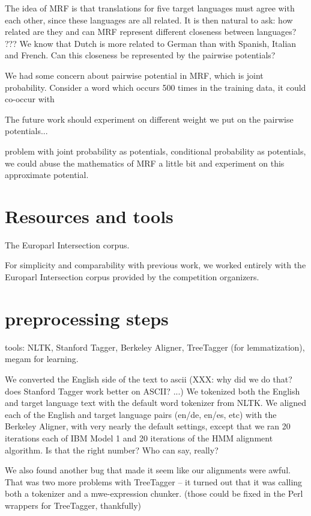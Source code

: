 \documentclass[11pt,letterpaper]{article}
\begin{document}
The idea of MRF is that translations for five target languages must agree with
each other, since these languages are all related.  It is then natural to ask:
how related are they and can MRF represent different closeness between
languages?  ???  We know that Dutch is more related to German than with
Spanish, Italian and French. Can this closeness be represented by the pairwise
potentials?

We had some concern about pairwise potential in MRF, which is joint
probability. Consider a word which occurs 500 times in the training data, it
could co-occur with

The future work should experiment on different weight we put on the pairwise
potentials...

problem with joint probability as potentials, conditional probability as
potentials, we could abuse the mathematics of MRF a little bit and experiment
on this approximate potential.

\section{Resources and tools}
The Europarl Intersection corpus.

For simplicity and comparability with previous work, we worked entirely with
the Europarl Intersection corpus provided by the competition organizers.
	

\section{preprocessing steps}
tools: NLTK, Stanford Tagger, Berkeley Aligner, TreeTagger (for lemmatization),
megam for learning.

We converted the English side of the text to ascii (XXX: why did we do that?
does Stanford Tagger work better on ASCII? ...) We tokenized both the English
and target language text with the default word tokenizer from NLTK.  We aligned
each of the English and target language pairs (en/de, en/es, etc) with the
Berkeley Aligner, with very nearly the default settings, except that we ran 20
iterations each of IBM Model 1 and 20 iterations of the HMM alignment
algorithm. Is that the right number? Who can say, really?

We also found another bug that made it seem like our alignments were awful.
That was two more problems with TreeTagger -- it turned out that it was calling
both a tokenizer and a mwe-expression chunker. (those could be fixed in the
Perl wrappers for TreeTagger, thankfully)
\end{document}

